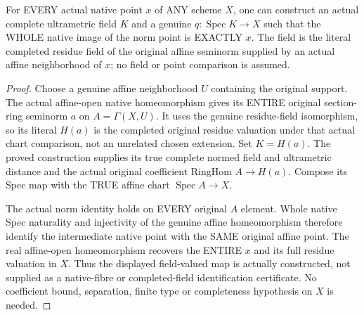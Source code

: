 \begin{lemma}
\label{scheme:native-completed-residue-field-point}
For EVERY actual native point $x$ of ANY scheme $X$, one can construct an actual
complete ultrametric field $K$ and a genuine $q:\operatorname{Spec}K\to X$ such
that the WHOLE native image of the norm point is EXACTLY $x$. The field is the
literal completed residue field of the original affine seminorm supplied by an
actual affine neighborhood of $x$; no field or point comparison is assumed.
\leanok
\end{lemma}
\begin{proof}
Choose a genuine affine neighborhood $U$ containing the original support. The
actual affine-open native homeomorphism gives its ENTIRE original section-ring
seminorm $a$ on $A=\Gamma(X,U)$. It uses the genuine residue-field isomorphism,
so its literal $H(a)$ is the completed original residue valuation under that
actual chart comparison, not an unrelated chosen extension. Set $K=H(a)$.
The proved construction supplies its true complete normed field and ultrametric
distance and the actual original coefficient RingHom $A\to H(a)$. Compose its
Spec map with the TRUE affine chart $\operatorname{Spec}A\to X$.

The actual norm identity holds on EVERY original $A$ element. Whole native
Spec naturality and injectivity of the genuine affine homeomorphism therefore
identify the intermediate native point with the SAME original affine point.
The real affine-open homeomorphism recovers the ENTIRE $x$ and its full residue
valuation in $X$. Thus the displayed field-valued map is actually constructed,
not supplied as a native-fibre or completed-field identification certificate.
No coefficient bound, separation, finite type or completeness hypothesis on $X$
is needed.
\end{proof}

